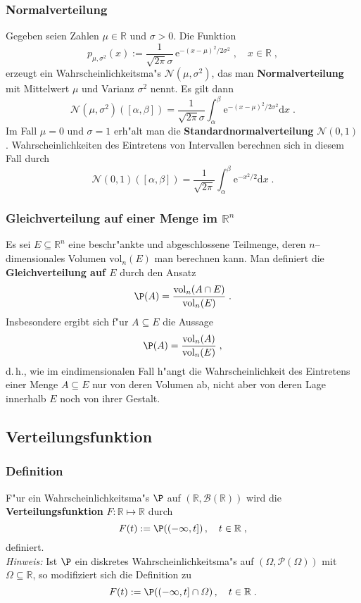\documentclass[ngerman,draft,parskip=half,twoside]{scrartcl}
\newcommand*{\R}{\mathbb{R}}      %
\newcommand*{\BorelM}{\mathcal{B}}  %
\newcommand*{\PotM}{\mathcal{P}}    %
\begin{document}
\subsubsection{Normalverteilung}
Gegeben seien Zahlen $\mu\in\R$ und $\sigma>0$. Die
Funktion
$$
p_{\mu,\sigma^2}(x):= \frac{1}{\sqrt{2\pi}\sigma}\,\mathrm e^{-(x-\mu)^2/2\sigma^2}\;,
\quad x\in\R\;,
$$
erzeugt ein Wahrscheinlichkeitsma"s $\mathcal N(\mu,\sigma^2)$, das
man \textbf{Normalverteilung} mit Mittelwert $\mu$ und Varianz $\sigma^2$ nennt. Es gilt dann
$$
\mathcal N(\mu,\sigma^2)([\alpha,\beta])=\frac{1}{\sqrt{2\pi}\sigma}
\int_\alpha^\beta \mathrm e^{-(x-\mu)^2/2\sigma^2}\mathrm dx\;.
$$
Im Fall $\mu=0$ und $\sigma=1$ erh"alt man die \textbf{Standardnormalverteilung}
$\mathcal N(0,1)$ . Wahrscheinlichkeiten des Eintretens von Intervallen berechnen sich in diesem Fall durch
$$
\mathcal N(0,1)([\alpha,\beta])=\frac{1}{\sqrt{2\pi}}
\int_\alpha^\beta \mathrm e^{-x^2/2}\mathrm dx\;.
$$

\subsubsection{Gleichverteilung auf einer Menge im $\R^n$}
Es sei $E\subseteq \R^n$ eine beschr"ankte und abgeschlossene
Teilmenge, deren $n$--dimensionales Volumen $\mathrm{vol}_n(E)$ man
berechnen kann. Man definiert die \textbf{Gleichverteilung auf $E$} durch den Ansatz
$$
\P(A)=\frac{\mathrm{vol}_n(A\cap E)}{\mathrm{vol}_n(E)}\;.
$$
Insbesondere ergibt sich f"ur $A\subseteq E$ die Aussage
$$
\P(A)=\frac{\mathrm{vol}_n(A)}{\mathrm{vol}_n(E)}\;,
$$
d.\,h., wie im eindimensionalen Fall h"angt die Wahrscheinlichkeit des Eintretens einer Menge $A\subseteq E$
nur von deren Volumen ab, nicht aber von deren Lage innerhalb $E$ noch von ihrer Gestalt.
\subsection{Verteilungsfunktion}
\subsubsection{Definition}
F"ur ein Wahrscheinlichkeitsma"s $\P$ auf $(\R,\BorelM(\R))$ wird die
\textbf{Verteilungsfunktion} $F\colon\R\mapsto\R$ durch
\begin{equation}
\label{F0}
F(t):=\P((-\infty,t])\,,\quad t\in\R  \;,
\end{equation}
definiert.\\
\textit{Hinweis:} Ist $\P$ ein diskretes Wahrscheinlichkeitsma"s auf $(\Omega,\PotM(\Omega))$ mit $\Omega\subseteq\R$,
so modifiziert sich die Definition zu
$$
F(t):=\P((-\infty,t]\cap\Omega)\,,\quad t\in\R  \;.
$$
\end{document}
